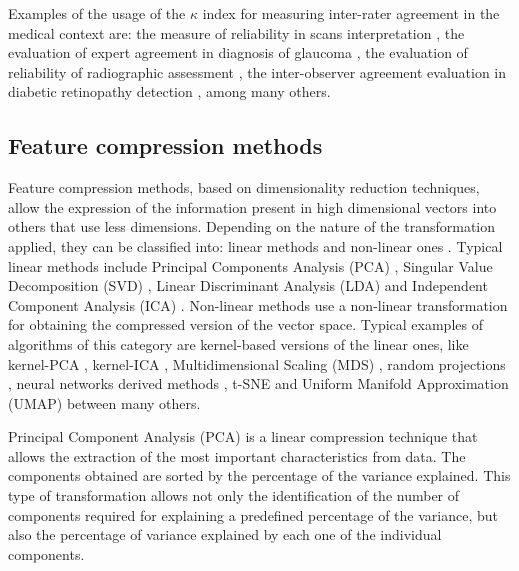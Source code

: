 \documentclass[review]{elsarticle}
\theoremstyle{definition} %
\theoremstyle{remark}
\begin{document}
Examples of the usage of the $\kappa$ index for measuring inter-rater agreement in the medical context are: the measure of reliability in  scans interpretation \citep{hintz2007interobserver}, the evaluation of expert agreement in diagnosis of glaucoma \citep{varma1992expert}, the evaluation of reliability of radiographic assessment \citep{gunther1999reliability}, the inter-observer agreement evaluation in diabetic retinopathy detection \citep{patra2009interobserver}, among many others.


\subsection{Feature compression methods}

Feature compression methods, based on dimensionality reduction techniques, allow the expression of the information present in high dimensional vectors into others that use less dimensions. Depending on the nature of the transformation applied, they can be classified into: linear methods \cite{cunningham2015linear} and non-linear ones \cite{sarveniazi2014actual}. Typical linear methods include Principal Components Analysis (PCA) \cite{jolliffe2011principal}, Singular Value Decomposition (SVD) \cite{golub1971singular}, Linear Discriminant Analysis (LDA) \cite{mika1999fisher} and Independent Component Analysis (ICA) \cite{hyvarinen2000independent}. Non-linear methods use a non-linear transformation for obtaining the compressed version of the vector space. Typical examples of algorithms of this category are kernel-based versions of the linear ones, like kernel-PCA \cite{mika1999kernel}, kernel-ICA \cite{yang2005kernel}, Multidimensional Scaling (MDS) \cite{borg2003modern}, random projections \cite{fradkin2003experiments}, neural networks derived methods \citep{hinton2006reducing}, t-SNE \cite{maaten2008visualizing} and Uniform Manifold Approximation (UMAP) \cite{DBLP:journals/jossw/McInnesHSG18} between many others.

Principal Component Analysis (PCA) \cite{jolliffe2011principal} is a linear compression technique that allows the extraction of the most important characteristics from data. The components obtained are sorted by the percentage of the variance explained. This type of transformation allows not only the identification of the number of components required for explaining a predefined percentage of the variance, but also the percentage of variance explained by each one of the individual components.
\end{document}
